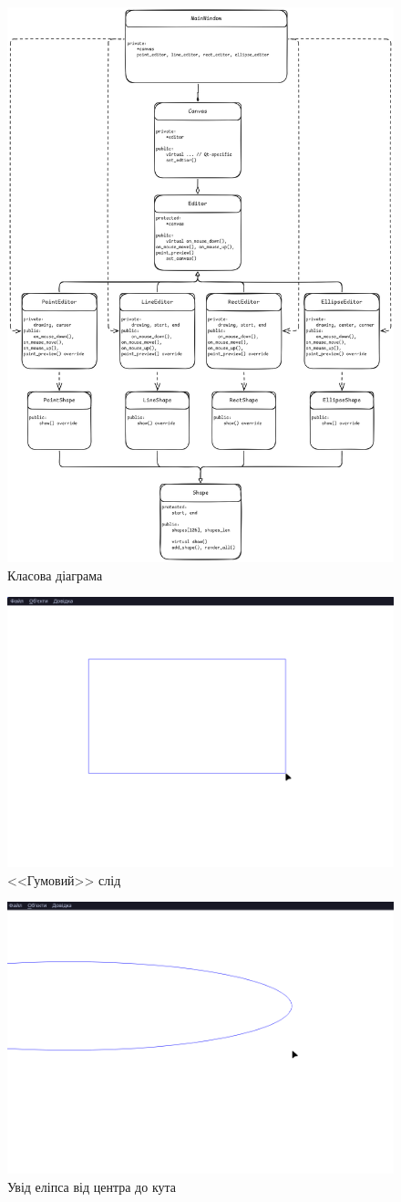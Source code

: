 \begin{figure}[h!]
  \center\includegraphics[width=0.8\linewidth]{class_diagram.png}
	\caption{Класова діаграма}
\end{figure}
\begin{figure}[p]
  \center\includegraphics[width=0.7\linewidth]{preview.png}
	\caption{<<Гумовий>> слід}
\end{figure}
\begin{figure}[p]
  \center\includegraphics[width=0.7\linewidth]{ellipse.png}
	\caption{Увід еліпса від центра до кута}
\end{figure}
